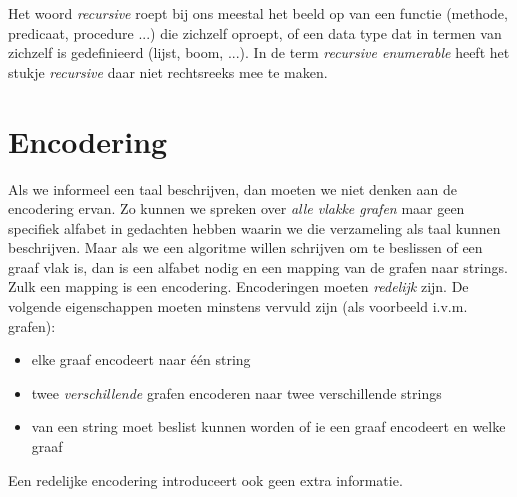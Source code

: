 Het woord {\em recursive} roept bij ons meestal het beeld op van een
functie (methode, predicaat, procedure ...) die zichzelf oproept, of
een data type dat in termen van zichzelf is gedefinieerd (lijst, boom,
...). In de term {\em recursive enumerable} heeft het stukje {\em
recursive} daar niet rechtsreeks mee te maken.



\section{Encodering}

Als we informeel een taal beschrijven, dan moeten we niet denken aan
de encodering ervan. Zo kunnen we spreken over {\em alle vlakke
grafen} maar geen specifiek alfabet in gedachten hebben waarin we die
verzameling als taal kunnen beschrijven. Maar als we een algoritme
willen schrijven om te beslissen of een graaf vlak is, dan is een
alfabet nodig en een mapping van de grafen naar strings. Zulk een
mapping is een encodering. Encoderingen moeten {\em redelijk} zijn.
De volgende eigenschappen moeten minstens vervuld zijn (als voorbeeld
i.v.m. grafen):
\begin{itemize}
\item elke graaf encodeert naar \'{e}\'{e}n string
\item twee {\em verschillende} grafen encoderen naar twee verschillende strings
\item van een string moet beslist kunnen worden of ie een graaf
encodeert en welke graaf
\end{itemize}
Een redelijke encodering introduceert ook geen extra informatie.


